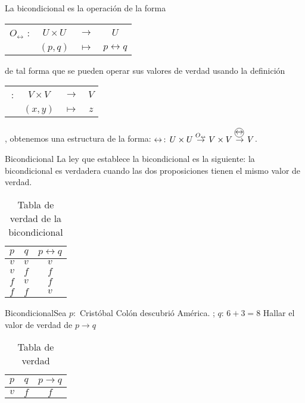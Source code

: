 La bicondicional es la operación de la forma %
\begin{tabular}{cccc}
$O_{\longleftrightarrow}$ : & $U\times U$ & $\rightarrow$ & %
$U$%
\tabularnewline
 & $\left(p,q\right)$ & $\mapsto$ & $p\leftrightarrow q$\tabularnewline
\end{tabular}de tal forma que se pueden operar sus valores de verdad usando la
definición %
\begin{tabular}{cccc}
\oper{$\leftrightarrow$}\,: & $V\times V$ & $\rightarrow$ & %
$V$%
\tabularnewline
 & $\left(x,y\right)$ & $\mapsto$ & $z$\tabularnewline
\end{tabular}, obtenemos una estructura de la forma: $\leftrightarrow\,:\, U\times U\overset{O_{\leftrightarrow}}{\rightarrow}V\times V\overset{\oper{\ensuremath{\leftrightarrow}}\,}{\rightarrow}V$.

\begin{definicionn}{ Bicondicional} La ley que establece la bicondicional
es la siguiente: la bicondicional es verdadera cuando las dos proposiciones
tienen el mismo valor de verdad.\end{definicionn}

\begin{table}[H]
\centering

\caption{Tabla de verdad de la bicondicional}


\setlength\arrayrulewidth{1pt} 

\begin{tabular}{c|c|c}
\arrayrulecolor{ptctitle}\hline\cellcolor{ptctitle!50}$p$ & \cellcolor{ptctitle!50}$q$ & \cellcolor{ptctitle!50}$p\longleftrightarrow q$\tabularnewline
\hline\cellcolor{ptcbackground}$v$ & \cellcolor{ptcbackground} $v$ & \cellcolor{ptcbackground}$v$\tabularnewline
\hline\cellcolor{gray!50}$v$ & \cellcolor{gray!50} $f$ & \cellcolor{gray!50}$f$\tabularnewline
\hline\cellcolor{ptcbackground}$f$ & \cellcolor{ptcbackground} $v$ & \cellcolor{ptcbackground}$f$\tabularnewline
\hline\cellcolor{gray!50}$f$ & \cellcolor{gray!50} $f$ & \cellcolor{gray!50}$v$\tabularnewline
\end{tabular}
\end{table}


\begin{ejem}{Bicondicional}Sea $p:$ Cristóbal Colón descubrió América.
; $q:\,6+3=8$ Hallar el valor de verdad de $p\rightarrow q$ \end{ejem}

\solucion

\begin{table}[H]
\centering

\caption{Tabla de verdad}


\begin{tabular}{c|c|c}
\arrayrulecolor{ptctitle}\cellcolor{gray!50}$p$ & \cellcolor{gray!50}$q$ & \cellcolor{gray!50}$p\rightarrow q$\tabularnewline
\hline 
\cellcolor{ptcbackground}$v$ & \cellcolor{ptcbackground}$f$ & \cellcolor{ptcbackground}$f$\tabularnewline
\hline 
\end{tabular}
\end{table}



